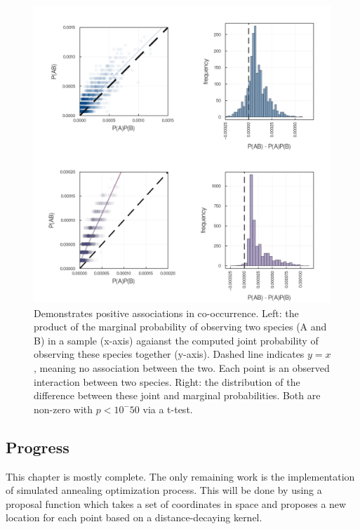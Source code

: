 \documentclass[10pt,oneside]{article}
\makeatletter
\def\maxwidth{\ifdim\Gin@nat@width>\linewidth\linewidth
\else\Gin@nat@width\fi}
\let\Oldincludegraphics\includegraphics
\renewcommand{\includegraphics}[1]{\Oldincludegraphics[width=\maxwidth]{#1}}
\makeatother
\begin{document}
\begin{figure}
\hypertarget{fig:posassoc}{%
\centering
\includegraphics{./figures/positiveassociations.png}
\caption{Demonstrates positive associations in co-occurrence. Left: the
product of the marginal probability of observing two species (A and B)
in a sample (x-axis) agaianst the computed joint probability of
observing these species together (y-axis). Dashed line indicates
\(y=x\), meaning no association between the two. Each point is an
observed interaction between two species. Right: the distribution of the
difference between these joint and marginal probabilities. Both are
non-zero with \(p < 10^-50\) via a t-test.}\label{fig:posassoc}
}
\end{figure}

\hypertarget{progress}{%
\subsection{Progress}\label{progress}}

This chapter is mostly complete. The only remaining work is the
implementation of simulated annealing optimization process. This will be
done by using a proposal function which takes a set of coordinates in
space and proposes a new location for each point based on a
distance-decaying kernel.
\end{document}
